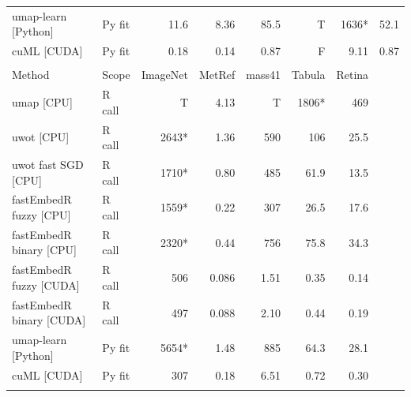 \begin{longtable}{@{}p{}lrrrrrr@{}}
umap-learn [Python] & Py fit & 11.6 & 8.36 & 85.5 & T & 1636* & 52.1 \\
cuML [CUDA] & Py fit & 0.18 & 0.14 & 0.87 & F & 9.11 & 0.87 \\
\addlinespace
\midrule
\multicolumn{8}{@{}l}{\textbf{C. UMAP, data sets 2/2}} \\
\midrule
Method & Scope & ImageNet & MetRef & mass41 & Tabula & Retina &  \\
\midrule
umap [CPU] & R call & T & 4.13 & T & 1806* & 469 &  \\
uwot [CPU] & R call & 2643* & 1.36 & 590 & 106 & 25.5 &  \\
uwot fast SGD [CPU] & R call & 1710* & 0.80 & 485 & 61.9 & 13.5 &  \\
fastEmbedR fuzzy [CPU] & R call & 1559* & 0.22 & 307 & 26.5 & 17.6 &  \\
fastEmbedR binary [CPU] & R call & 2320* & 0.44 & 756 & 75.8 & 34.3 &  \\
fastEmbedR fuzzy [CUDA] & R call & 506 & 0.086 & 1.51 & 0.35 & 0.14 &  \\
fastEmbedR binary [CUDA] & R call & 497 & 0.088 & 2.10 & 0.44 & 0.19 &  \\
umap-learn [Python] & Py fit & 5654* & 1.48 & 885 & 64.3 & 28.1 &  \\
cuML [CUDA] & Py fit & 307 & 0.18 & 6.51 & 0.72 & 0.30 &  \\
\addlinespace
\midrule
\bottomrule
\end{longtable}
\endgroup
